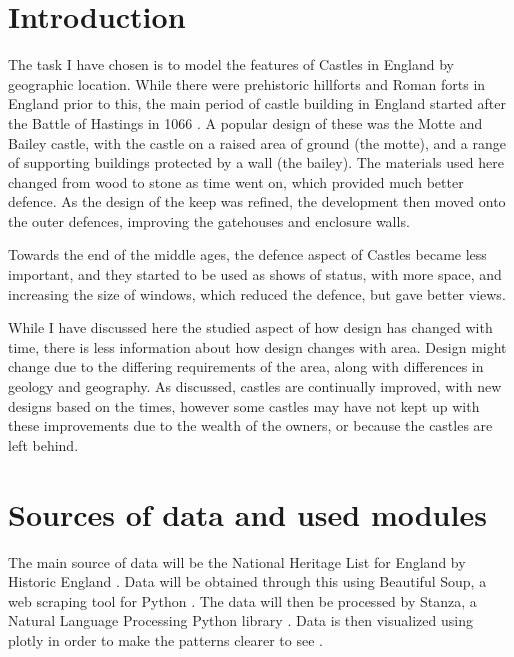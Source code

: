 \documentclass[11pt]{article}
\begin{document}
\maketitle

\section{Introduction}

The task I have chosen is to model the features of Castles in England by geographic location. While there were prehistoric hillforts and Roman forts in England prior to this, the main period of castle building in England started after the Battle of Hastings in 1066 \cite{RichardHodges1988OotE}. A popular design of these was the Motte and Bailey castle, with the castle on a raised area of ground (the motte), and a range of supporting buildings protected by a wall (the bailey). The materials used here changed from wood to stone as time went on, which provided much better defence. As the design of the keep was refined, the development then moved onto the outer defences, improving the gatehouses and enclosure walls.

Towards the end of the middle ages, the defence aspect of Castles became less important, and they started to be used as shows of status, with more space, and increasing the size of windows, which reduced the defence, but gave better views.

While I have discussed here the studied aspect of how design has changed with time, there is less information about how design changes with area. Design might change due to the differing requirements of the area, along with differences in geology and geography. As discussed, castles are continually improved, with new designs based on the times, however some castles may have not kept up with these improvements due to the wealth of the owners, or because the castles are left behind.


\section{Sources of data and used modules}

The main source of data will be the National Heritage List for England by Historic England \cite{nhle}. Data will be obtained through this using Beautiful Soup, a web scraping tool for Python \cite{bs}. The data will then be processed by Stanza, a Natural Language Processing Python library \cite{qi2020stanza}. Data is then visualized using plotly in order to make the patterns clearer to see \cite{plotly}.
\end{document}
